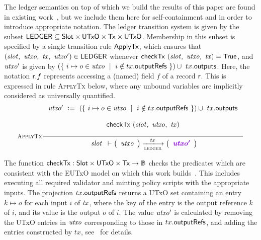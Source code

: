 \label{sec:ledgersem}
The ledger semantics on top of which we build the results of this paper
are found in existing work~\cite{eutxo,eutxoma,structured}, but we include them here
for self-containment and in order to introduce appropriate notation.
The ledger transition system is given by the subset
$\mathsf{LEDGER} \subseteq \mathsf{Slot} \times \mathsf{UTxO} \times \mathsf{Tx} \times \mathsf{UTxO}$.
Membership in this subset is specified by a single transition rule $\mathsf{ApplyTx}$,
which ensures that
$(\mathit{slot},~\mathit{utxo},~\mathit{tx},~\mathit{utxo'}) \in \mathsf{LEDGER}$
whenever $\mathsf{checkTx}~(\mathit{slot},~\mathit{utxo},~\mathit{tx}) = \mathsf{True}$, and $\mathit{utxo'}$
is given by $(\{~i\mapsto o \in \mathit{utxo} ~\mid~ i \notin tx.\mathsf{outputRefs}~\}) \cup ~tx.\mathsf{outputs} $.
Here, the notation $\mathsf{r}.f$ represents accessing a (named) field $f$ of a record $\mathsf{r}$.
This is expressed in rule \textsc{ApplyTx} below,
where any unbound variables are implicitly considered as universally quantified.
\begin{equation*}
\inference[\textsc{ApplyTx}]
{
\var{utxo'}~\leteq~(\{~i\mapsto o \in \var{utxo} ~\mid~ i \notin tx.\fun{outputRefs}~\}) \cup ~tx.\fun{outputs}\\ ~ \\
\fun{checkTx}~(\var{slot},~\var{utxo},~\var{tx})
\\ ~ \\
}
{
\begin{array}{l}
    \var{slot}\\
\end{array}
    \vdash
    \left(
    \begin{array}{r}
    \var{utxo} \\
    \end{array}
    \right)
    \trans{ledger}{tx}
    \left(
    \begin{array}{r}
    \varUpdate{\var{utxo'}}  \\
    \end{array}
    \right) \\
}
\end{equation*}

The function $\mathsf{checkTx} : \mathsf{Slot} \times \mathsf{UTxO} \times \mathsf{Tx} \to \mathbb{B}$
checks the predicates which are consistent
with the EUTxO model on which this work builds~\cite{eutxoma,structured}.
This includes executing all required validator and minting policy scripts with
the appropriate inputs.
%
The projection $tx.\mathsf{outputRefs}$ returns a UTxO set containing an entry $k \mapsto o$
for each input $i$ of $\mathit{tx}$, where the key of
the entry is the output reference $k$ of $i$, and its value
is the output $o$ of $i$.
The value $\mathit{utxo'}$ is calculated by removing the UTxO entries in $\mathit{utxo}$
corresponding to those in $tx.\mathsf{outputRefs}$, and adding the entries
constructed by $tx$, see~\cite{structured} for details. 
